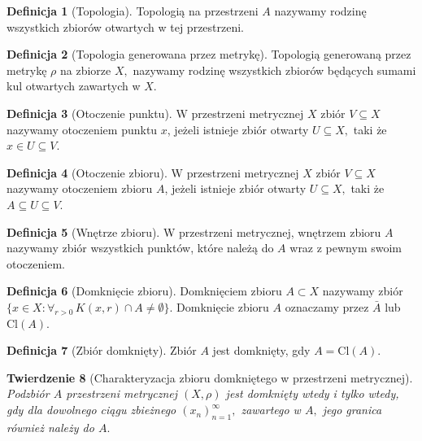 \documentclass[licencjacka]{pwr_wmat_praca_dyplomowa}
\theoremstyle{plain}
\newtheorem{theorem}{Twierdzenie}
\numberwithin{theorem}{chapter}
\theoremstyle{definition}
\numberwithin{theorem}{chapter}
\newtheorem{definition}[theorem]{Definicja}
\begin{document}
\begin{definition}[Topologia]
Topologią na przestrzeni $A$ nazywamy rodzinę wszystkich zbiorów otwartych w tej przestrzeni.
\end{definition}

\begin{definition}[Topologia generowana przez metrykę]
Topologią generowaną przez metrykę $\rho$ na zbiorze $X,$ nazywamy rodzinę wszystkich zbiorów będących sumami kul otwartych zawartych w $X.$
\end{definition}

\begin{definition}[Otoczenie punktu]
W przestrzeni metrycznej $X$ zbiór $V \subseteq X$ nazywamy otoczeniem punktu $x$, jeżeli istnieje zbiór otwarty $U \subseteq X,$ taki że $x \in U \subseteq V$.
\end{definition}

\begin{definition}[Otoczenie zbioru]
W przestrzeni metrycznej $X$ zbiór $V \subseteq X$ nazywamy otoczeniem zbioru $A$, jeżeli istnieje zbiór otwarty $U \subseteq X,$ taki że $A \subseteq U \subseteq V$.
\end{definition}



\begin{definition}[Wnętrze zbioru]
W przestrzeni metrycznej, wnętrzem zbioru $A$ nazywamy zbiór wszystkich punktów, które należą do $A$ wraz z pewnym swoim otoczeniem.
\end{definition}

\begin{definition}[Domknięcie zbioru]
Domknięciem zbioru $A \subset X$ nazywamy zbiór $\{x \in X: \forall_{r>0} \, K(x, r) \cap A \neq \emptyset\}$. Domknięcie zbioru $A$ oznaczamy przez $\bar{A}$ lub $\textrm{Cl}(A)$.
\end{definition}

\begin{definition}[Zbiór domknięty]
Zbiór $A$ jest domknięty, gdy $A = \textrm{Cl}(A)$.
\end{definition}



\begin{theorem}[Charakteryzacja zbioru domkniętego w przestrzeni metrycznej]
Podzbiór $A$ przestrzeni metrycznej $(X, \rho)$ jest domknięty wtedy i tylko wtedy, gdy dla dowolnego ciągu zbieżnego $(x_n)_{n=1}^{\infty},$ zawartego w  $A,$ jego granica również należy do $A.$
\end{theorem}
\end{document}
